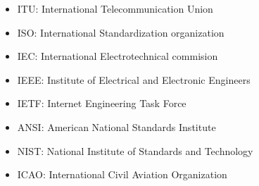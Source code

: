 \begin{itemize}
\item ITU: International Telecommunication Union
\item ISO: International Standardization organization
\item IEC: International Electrotechnical commision
\item IEEE: Institute of Electrical and Electronic Engineers
\item IETF: Internet Engineering Task Force
\item ANSI: American National Standards Institute
\item NIST: National Institute of Standards and Technology 
\item ICAO: International Civil Aviation Organization
\end{itemize}

